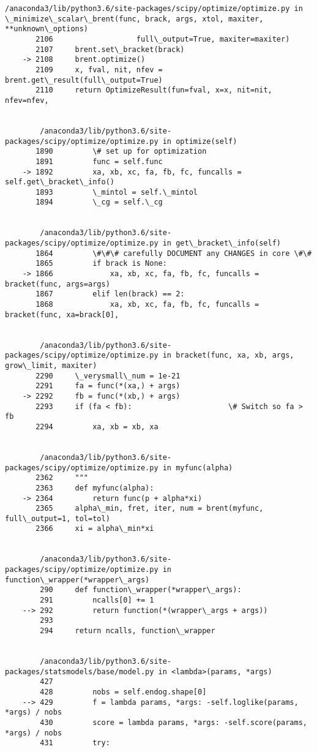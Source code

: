 \documentclass[11pt]{article}
\begin{document}
\begin{Verbatim}[commandchars=\\\{\}]
        /anaconda3/lib/python3.6/site-packages/scipy/optimize/optimize.py in \_minimize\_scalar\_brent(func, brack, args, xtol, maxiter, **unknown\_options)
       2106                   full\_output=True, maxiter=maxiter)
       2107     brent.set\_bracket(brack)
    -> 2108     brent.optimize()
       2109     x, fval, nit, nfev = brent.get\_result(full\_output=True)
       2110     return OptimizeResult(fun=fval, x=x, nit=nit, nfev=nfev,


        /anaconda3/lib/python3.6/site-packages/scipy/optimize/optimize.py in optimize(self)
       1890         \# set up for optimization
       1891         func = self.func
    -> 1892         xa, xb, xc, fa, fb, fc, funcalls = self.get\_bracket\_info()
       1893         \_mintol = self.\_mintol
       1894         \_cg = self.\_cg


        /anaconda3/lib/python3.6/site-packages/scipy/optimize/optimize.py in get\_bracket\_info(self)
       1864         \#\#\# carefully DOCUMENT any CHANGES in core \#\#
       1865         if brack is None:
    -> 1866             xa, xb, xc, fa, fb, fc, funcalls = bracket(func, args=args)
       1867         elif len(brack) == 2:
       1868             xa, xb, xc, fa, fb, fc, funcalls = bracket(func, xa=brack[0],


        /anaconda3/lib/python3.6/site-packages/scipy/optimize/optimize.py in bracket(func, xa, xb, args, grow\_limit, maxiter)
       2290     \_verysmall\_num = 1e-21
       2291     fa = func(*(xa,) + args)
    -> 2292     fb = func(*(xb,) + args)
       2293     if (fa < fb):                      \# Switch so fa > fb
       2294         xa, xb = xb, xa


        /anaconda3/lib/python3.6/site-packages/scipy/optimize/optimize.py in myfunc(alpha)
       2362     """
       2363     def myfunc(alpha):
    -> 2364         return func(p + alpha*xi)
       2365     alpha\_min, fret, iter, num = brent(myfunc, full\_output=1, tol=tol)
       2366     xi = alpha\_min*xi


        /anaconda3/lib/python3.6/site-packages/scipy/optimize/optimize.py in function\_wrapper(*wrapper\_args)
        290     def function\_wrapper(*wrapper\_args):
        291         ncalls[0] += 1
    --> 292         return function(*(wrapper\_args + args))
        293 
        294     return ncalls, function\_wrapper


        /anaconda3/lib/python3.6/site-packages/statsmodels/base/model.py in <lambda>(params, *args)
        427 
        428         nobs = self.endog.shape[0]
    --> 429         f = lambda params, *args: -self.loglike(params, *args) / nobs
        430         score = lambda params, *args: -self.score(params, *args) / nobs
        431         try:



\end{Verbatim}
\end{document}
